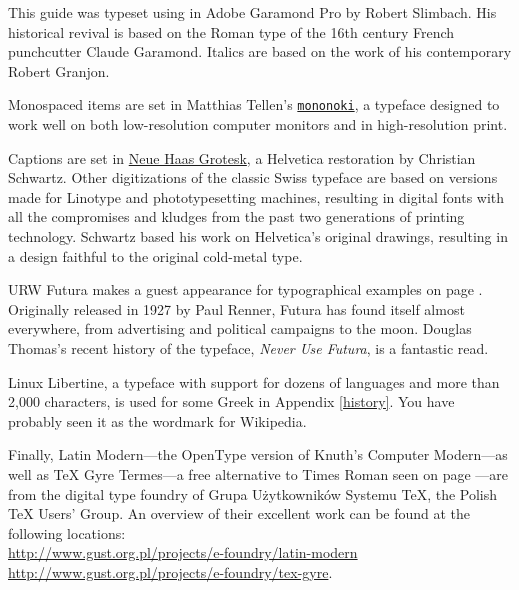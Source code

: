 This guide was typeset using \LuaLaTeX{} in Adobe Garamond Pro by
Robert Slimbach.
His historical revival is based on the Roman type of
the 16{th} century French
punchcutter Claude Garamond.
Italics are based on the work of his contemporary Robert Granjon.

Monospaced items are set in Matthias Tellen's
\href{https://madmalik.github.io/mononoki/}{\texttt{mononoki}},
a typeface designed to work well on both low-resolution computer monitors
and in high-resolution print.

Captions are set in
\href{http://www.fontbureau.com/NHG/}{\textsf{\small Neue Haas Grotesk}},
a Helvetica restoration by Christian Schwartz.
Other digitizations of the classic Swiss typeface are based on versions made for
Linotype and phototypesetting machines,
resulting in digital fonts with all the compromises and kludges from the past two
generations of printing technology.
Schwartz based his work on Helvetica's original drawings,
resulting in a design faithful to the original cold-metal type.

{URW Futura}
makes a guest appearance
for typographical examples on page \pageref{typography}.
Originally released in 1927 by Paul Renner,
Futura has found itself almost everywhere,
from advertising and political campaigns to the moon.
Douglas Thomas's recent history of the typeface,
\textit{Never Use Futura}, is a fantastic read.

{Linux Libertine},
a typeface with support for dozens of languages and more than 2,000 characters,
is used for some Greek in Appendix \ref{history}.
You have probably seen it as the wordmark for Wikipedia.

Finally,
Latin Modern---the OpenType version of Knuth's Computer Modern---as well
as {\TeX{} Gyre Termes}---a
free alternative to Times Roman seen on page \pageref{typography}---are from
the digital type foundry of Grupa Użytkowników Systemu \TeX{},
the Polish \TeX{} Users' Group.
An overview of their excellent work can be found at the following locations:\\
\url{http://www.gust.org.pl/projects/e-foundry/latin-modern} \\
\url{http://www.gust.org.pl/projects/e-foundry/tex-gyre}.
